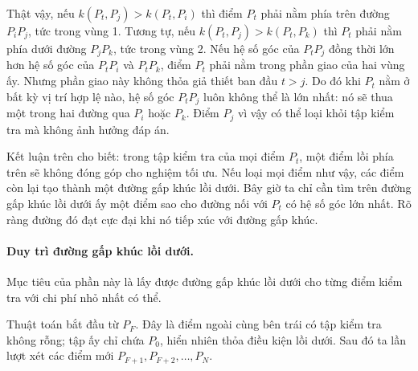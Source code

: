\documentclass[11pt]{article}
\begin{document}
Thật vậy, nếu $k(P_t,P_j)>k(P_t,P_i)$ thì điểm $P_t$ phải nằm phía trên
đường $P_iP_j$, tức trong vùng 1. Tương tự, nếu
$k(P_t,P_j)>k(P_t,P_k)$ thì $P_t$ phải nằm phía dưới đường $P_jP_k$, tức
trong vùng 2. Nếu hệ số góc của $P_tP_j$ đồng thời lớn hơn hệ số góc của
$P_tP_i$ và $P_tP_k$, điểm $P_t$ phải nằm trong phần giao của hai vùng ấy.
Nhưng phần giao này không thỏa giả thiết ban đầu $t>j$. Do đó khi $P_t$ nằm
ở bất kỳ vị trí hợp lệ nào, hệ số góc $P_tP_j$ luôn không thể là lớn nhất:
nó sẽ thua một trong hai đường qua $P_i$ hoặc $P_k$. Điểm $P_j$ vì vậy có
thể loại khỏi tập kiểm tra mà không ảnh hưởng đáp án.

Kết luận trên cho biết: trong tập kiểm tra của mọi điểm $P_t$, một điểm lồi
phía trên sẽ không đóng góp cho nghiệm tối ưu. Nếu loại mọi điểm như vậy, các
điểm còn lại tạo thành một đường gấp khúc lồi dưới. Bây giờ ta chỉ cần tìm
trên đường gấp khúc lồi dưới ấy một điểm sao cho đường nối với $P_t$ có hệ
số góc lớn nhất. Rõ ràng đường đó đạt cực đại khi nó tiếp xúc với đường gấp
khúc.

\begin{center}
\end{center}

\paragraph{Duy trì đường gấp khúc lồi dưới.}
Mục tiêu của phần này là lấy được đường gấp khúc lồi dưới cho từng điểm kiểm
tra với chi phí nhỏ nhất có thể.

Thuật toán bắt đầu từ $P_F$. Đây là điểm ngoài cùng bên trái có tập kiểm tra
không rỗng; tập ấy chỉ chứa $P_0$, hiển nhiên thỏa điều kiện lồi dưới. Sau
đó ta lần lượt xét các điểm mới $P_{F+1},P_{F+2},\ldots,P_N$.
\end{document}

